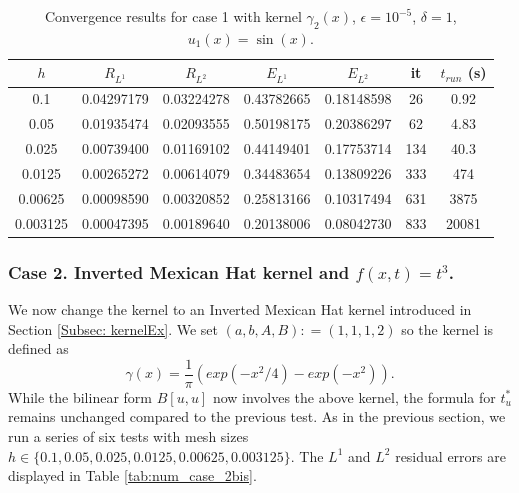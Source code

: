 \documentclass[11pt]{amsart}   	%
\theoremstyle{plain}
\numberwithin{equation}{section}
\begin{document}
\begin{table}[H]
    \centering
    \caption{Convergence results for case 1 with kernel $\gamma_2(x)$, $\epsilon=10^{-5}$, $\delta=1$, $u_1(x)=\sin(x)$.}%
    \begin{tabular}{|c||c|c||c|c||c|c|}
    \hline
    $h$ & $R_{L^1}$ & $R_{L^2} $ & $E_{L^1}$ & $E_{L^2}$ & it & $t_{run}$ (s)
    \\ \hline
    0.1 & 0.04297179 & 0.03224278 & 0.43782665 & 0.18148598 & 26 & 0.92
    \\ \hline
    0.05 & 0.01935474 & 0.02093555 & 0.50198175 & 0.20386297 & 62 & 4.83
    \\ \hline
    0.025 & 0.00739400 & 0.01169102 & 0.44149401 & 0.17753714 & 134 & 40.3 
    \\ \hline
    0.0125 & 0.00265272 & 0.00614079 & 0.34483654 & 0.13809226 & 333 & 474
    \\ \hline
    0.00625 & 0.00098590 & 0.00320852 & 0.25813166 & 0.10317494 & 631 & 3875    
    \\ \hline
    0.003125 & 0.00047395 & 0.00189640 & 0.20138006 & 0.08042730 & 833 & 20081
    \\ \hline  
    \end{tabular}
    \label{tab:num_case_1bbis}
\end{table}



\subsubsection{Case 2. Inverted Mexican Hat kernel and $f(x,t)=t^3$.} We now change the kernel to an Inverted Mexican Hat kernel introduced in Section \ref{Subsec: kernelEx}. We set $(a,b,A,B): =(1,1,1,2)$ so the kernel is defined as
$$\gamma(x) = \frac{1}{\pi}\left( exp(-x^2/4) - exp(-x^2) \right).$$
While the bilinear form $B[u,u]$ now involves the above kernel, the formula for $t^*_u$ remains unchanged compared to the previous test.
As in the previous section, we run a series of six tests with mesh sizes $h\in \{0.1, 0.05, 0.025, 0.0125, 0.00625, 0.003125\}$. The $L^1$ and $L^2$ residual errors are displayed in Table \ref{tab:num_case_2bis}.
\end{document}
